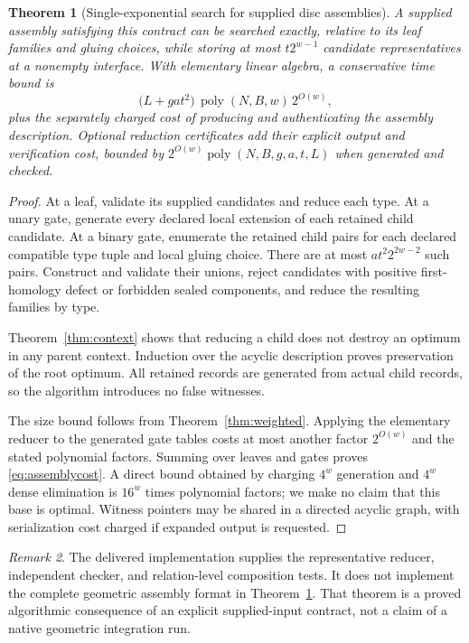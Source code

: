 \documentclass[11pt,a4paper]{article}
\newtheorem{theorem}{Theorem}[section]
\theoremstyle{remark}\newtheorem{remark}[theorem]{Remark}
\newcommand{\poly}{\operatorname{poly}}
\begin{document}
\begin{theorem}[Single-exponential search for supplied disc assemblies]\label{thm:assembly}
A supplied assembly satisfying this contract can be searched exactly, relative to its leaf families and gluing choices, while storing at most $t2^{w-1}$ candidate representatives at a nonempty interface. With elementary linear algebra, a conservative time bound is
\begin{equation}\label{eq:assemblycost}
 \bigl(L+ga t^2\bigr)\,\poly(N,B,w)\,2^{O(w)},
\end{equation}
plus the separately charged cost of producing and authenticating the assembly description. Optional reduction certificates add their explicit output and verification cost, bounded by $2^{O(w)}\poly(N,B,g,a,t,L)$ when generated and checked.
\end{theorem}
\begin{proof}
At a leaf, validate its supplied candidates and reduce each type. At a unary gate, generate every declared local extension of each retained child candidate. At a binary gate, enumerate the retained child pairs for each declared compatible type tuple and local gluing choice. There are at most $a t^2 2^{2w-2}$ such pairs. Construct and validate their unions, reject candidates with positive first-homology defect or forbidden sealed components, and reduce the resulting families by type.

Theorem~\ref{thm:context} shows that reducing a child does not destroy an optimum in any parent context. Induction over the acyclic description proves preservation of the root optimum. All retained records are generated from actual child records, so the algorithm introduces no false witnesses.

The size bound follows from Theorem~\ref{thm:weighted}. Applying the elementary reducer to the generated gate tables costs at most another factor $2^{O(w)}$ and the stated polynomial factors. Summing over leaves and gates proves \eqref{eq:assemblycost}. A direct bound obtained by charging $4^w$ generation and $4^w$ dense elimination is $16^w$ times polynomial factors; we make no claim that this base is optimal. Witness pointers may be shared in a directed acyclic graph, with serialization cost charged if expanded output is requested.
\end{proof}

\begin{remark}
The delivered implementation supplies the representative reducer, independent checker, and relation-level composition tests. It does not implement the complete geometric assembly format in Theorem~\ref{thm:assembly}. That theorem is a proved algorithmic consequence of an explicit supplied-input contract, not a claim of a native geometric integration run.
\end{remark}
\end{document}
